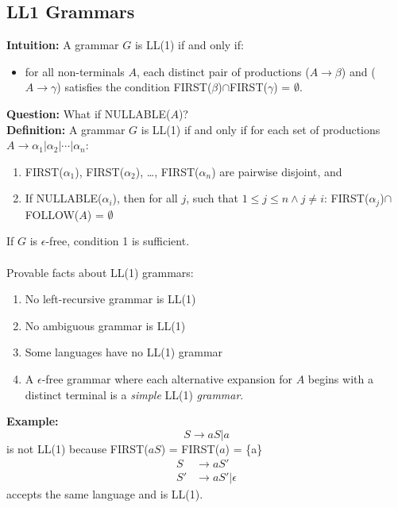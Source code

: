 \documentclass[10pt]{article}
\begin{document}
\subsection*{LL1 Grammars}
\textbf{Intuition:} A grammar $G$ is LL(1) if and only if:
\begin{itemize}
    \item for all non-terminals $A$, each distinct pair of productions ($A \rightarrow \beta$) and ($A \rightarrow \gamma$) satisfies the condition FIRST($\beta$)$\cap$FIRST($\gamma$) = $\emptyset$.
\end{itemize}
\textbf{Question:} What if NULLABLE($A$)?\\
\textbf{Definition:} A grammar $G$ is LL(1) if and only if for each set of productions $A \rightarrow \alpha_1 \vert \alpha_2 \vert \cdots \vert \alpha_n$:
\begin{enumerate}
    \item FIRST($\alpha_1$), FIRST($\alpha_2$), \dots, FIRST($\alpha_n$) are pairwise disjoint, and
    \item If NULLABLE($\alpha_i$), then for all $j$, such that $1 \leq j \leq n \land j \neq i$: FIRST($\alpha_j$)$\cap$FOLLOW($A$) = $\emptyset$
\end{enumerate}
If $G$ is $\epsilon$-free, condition 1 is sufficient.\\\\
Provable facts about LL(1) grammars:
\begin{enumerate}
    \item No left-recursive grammar is LL(1)
    \item No ambiguous grammar is LL(1)
    \item Some languages have no LL(1) grammar
    \item A $\epsilon$-free grammar where each alternative expansion for $A$ begins with a distinct terminal is a \textit{simple} LL(1) \textit{grammar}.
\end{enumerate}
\textbf{Example:}
\[S \rightarrow aS \vert a\]
is not LL(1) because FIRST($aS$) = FIRST($a$) = \{a\}
\begin{align*}
    S &\rightarrow aS'\\
    S' &\rightarrow aS' \vert \epsilon
\end{align*}
accepts the same language and is LL(1).
\end{document}
